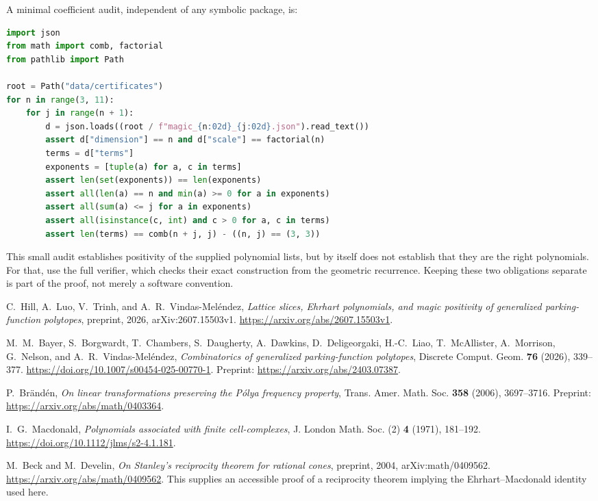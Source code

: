 \documentclass[11pt]{article}
\theoremstyle{definition}
\numberwithin{equation}{section}
\begin{document}
A minimal coefficient audit, independent of any symbolic package, is:
\begin{lstlisting}[language=Python]
import json
from math import comb, factorial
from pathlib import Path

root = Path("data/certificates")
for n in range(3, 11):
    for j in range(n + 1):
        d = json.loads((root / f"magic_{n:02d}_{j:02d}.json").read_text())
        assert d["dimension"] == n and d["scale"] == factorial(n)
        terms = d["terms"]
        exponents = [tuple(a) for a, c in terms]
        assert len(set(exponents)) == len(exponents)
        assert all(len(a) == n and min(a) >= 0 for a in exponents)
        assert all(sum(a) <= j for a in exponents)
        assert all(isinstance(c, int) and c > 0 for a, c in terms)
        assert len(terms) == comb(n + j, j) - ((n, j) == (3, 3))
\end{lstlisting}
This small audit establishes positivity of the supplied polynomial lists,
but by itself does not establish that they are the right polynomials.
For that, use the full verifier, which checks their exact construction
from the geometric recurrence. Keeping these two obligations separate
is part of the proof, not merely a software convention.

\begin{thebibliography}{9}
C.~Hill, A.~Luo, V.~Trinh, and A.~R.~Vindas-Mel\'endez,
\emph{Lattice slices, Ehrhart polynomials, and magic positivity of generalized
parking-function polytopes}, preprint, 2026, arXiv:2607.15503v1.
\url{https://arxiv.org/abs/2607.15503v1}.

M.~M.~Bayer, S.~Borgwardt, T.~Chambers, S.~Daugherty, A.~Dawkins,
D.~Deligeorgaki, H.-C.~Liao, T.~McAllister, A.~Morrison, G.~Nelson,
and A.~R.~Vindas-Mel\'endez,
\emph{Combinatorics of generalized parking-function polytopes},
Discrete Comput. Geom. \textbf{76} (2026), 339--377.
\url{https://doi.org/10.1007/s00454-025-00770-1}.
Preprint: \url{https://arxiv.org/abs/2403.07387}.

P.~Br\"and\'en, \emph{On linear transformations preserving the P\'olya
frequency property}, Trans. Amer. Math. Soc. \textbf{358} (2006),
3697--3716. Preprint: \url{https://arxiv.org/abs/math/0403364}.

I.~G.~Macdonald, \emph{Polynomials associated with finite cell-complexes},
J. London Math. Soc. (2) \textbf{4} (1971), 181--192.
\url{https://doi.org/10.1112/jlms/s2-4.1.181}.

M.~Beck and M.~Develin, \emph{On Stanley's reciprocity theorem for rational
cones}, preprint, 2004, arXiv:math/0409562.
\url{https://arxiv.org/abs/math/0409562}.
This supplies an accessible proof of a reciprocity theorem implying the
Ehrhart--Macdonald identity used here.
\end{thebibliography}
\end{document}
